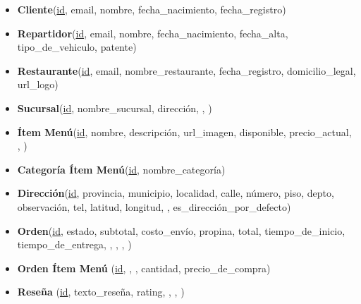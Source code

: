 \begin{itemize}
    \item \textbf{Cliente}(\underline{id}, email, nombre, fecha\_nacimiento, fecha\_registro)
    
    \item \textbf{Repartidor}(\underline{id}, email, nombre, fecha\_nacimiento, fecha\_alta, tipo\_de\_vehiculo, patente)
    
    \item \textbf{Restaurante}(\underline{id}, email, nombre\_restaurante, fecha\_registro, domicilio\_legal, url\_logo)
    
    \item \textbf{Sucursal}(\underline{id}, nombre\_sucursal, dirección, , )
    
    \item \textbf{Ítem Menú}(\underline{id}, nombre, descripción, url\_imagen, disponible, precio\_actual, , )
    
    \item \textbf{Categoría Ítem Menú}(\underline{id}, nombre\_categoría)
    
    \item \textbf{Dirección}(\underline{id}, provincia, municipio, localidad, calle, número, piso, depto, observación, tel, latitud, longitud, , es\_dirección\_por\_defecto)
    
    \item \textbf{Orden}(\underline{id}, estado, subtotal, costo\_envío, propina, total, tiempo\_de\_inicio, tiempo\_de\_entrega, , , , )
    
    \item \textbf{Orden Ítem Menú} (\underline{id}, , , cantidad, precio\_de\_compra)
    
    \item \textbf{Reseña} (\underline{id}, texto\_reseña, rating, , , )
\end{itemize}
